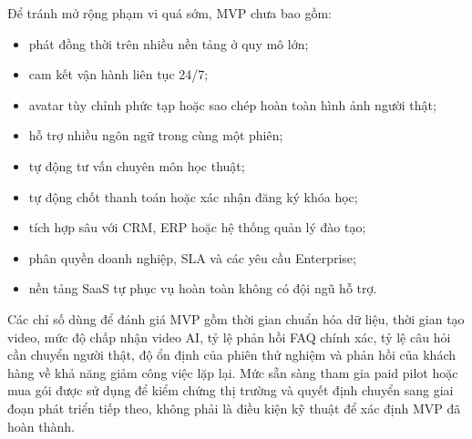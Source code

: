 Để tránh mở rộng phạm vi quá sớm, MVP chưa bao gồm:

\begin{itemize}
    \item phát đồng thời trên nhiều nền tảng ở quy mô lớn;
    \item cam kết vận hành liên tục 24/7;
    \item avatar tùy chỉnh phức tạp hoặc sao chép hoàn toàn hình ảnh người thật;
    \item hỗ trợ nhiều ngôn ngữ trong cùng một phiên;
    \item tự động tư vấn chuyên môn học thuật;
    \item tự động chốt thanh toán hoặc xác nhận đăng ký khóa học;
    \item tích hợp sâu với CRM, ERP hoặc hệ thống quản lý đào tạo;
    \item phân quyền doanh nghiệp, SLA và các yêu cầu Enterprise;
    \item nền tảng SaaS tự phục vụ hoàn toàn không có đội ngũ hỗ trợ.
\end{itemize}

Các chỉ số dùng để đánh giá MVP gồm thời gian chuẩn hóa dữ liệu, thời gian tạo
video, mức độ chấp nhận video AI, tỷ lệ phản hồi FAQ chính xác, tỷ lệ câu hỏi
cần chuyển người thật, độ ổn định của phiên thử nghiệm và phản hồi của khách
hàng về khả năng giảm công việc lặp lại. Mức sẵn sàng tham gia paid pilot hoặc
mua gói được sử dụng để kiểm chứng thị trường và quyết định chuyển sang giai
đoạn phát triển tiếp theo, không phải là điều kiện kỹ thuật để xác định MVP đã
hoàn thành.